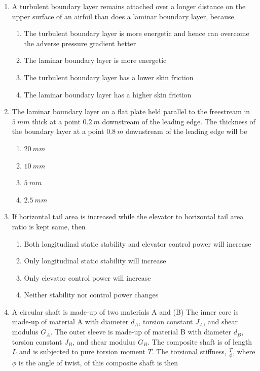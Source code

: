 \documentclass{article}
\begin{document}
\begin{enumerate}
    \item A turbulent boundary layer remains attached over a longer distance on the upper surface of an airfoil than does a laminar boundary layer, because
    \begin{enumerate}
        \item The turbulent boundary layer is more energetic and hence can overcome the adverse pressure gradient better
        \item The laminar boundary layer is more energetic
        \item The turbulent boundary layer has a lower skin friction
        \item The laminar boundary layer has a higher skin friction
    \end{enumerate}
        

    \item The laminar boundary layer on a flat plate held parallel to the freestream in $5\ mm$ thick at a point $0.2\ m$ downstream of the leading edge. The thickness of the boundary layer at a point $0.8\ m$ downstream of the leading edge will be
    \begin{multicols}{4}
    \begin{enumerate}
        \item $20\ mm$
        \item $10\ mm$
        \item $5\ mm$
        \item $2.5\ mm$
    \end{enumerate}
    \end{multicols}
        

    \item If horizontal tail area is increased while the elevator to horizontal tail area ratio is kept same, then
    \begin{enumerate}
        \item Both longitudinal static stability and elevator control power will increase
        \item Only longitudinal static stability will increase
        \item Only elevator control power will increase
        \item Neither stability nor control power changes
    \end{enumerate}
        

    \item A circular shaft is made-up of two materials A and (B) The inner core is made-up of material A with diameter $d_A$, torsion constant $J_A$, and shear modulus $G_A$. The outer sleeve is made-up of material B with diameter $d_B$, torsion constant $J_B$, and shear modulus $G_B$. The composite shaft is of length $L$ and is subjected to pure torsion moment $T$. The torsional stiffness, $\frac{T}{\phi}$, where $\phi$ is the angle of twist, of this composite shaft is then
        \begin{figure}[H]
            \centering
            
            \caption{}
            \label{}
        \end{figure}


\end{enumerate}
\end{document}
